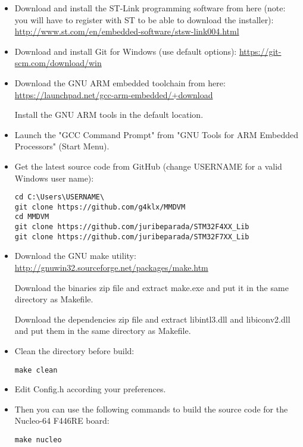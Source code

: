 \documentclass[]{article}
\begin{document}
\begin{itemize}[leftmargin=*]
\item Download and install the ST-Link programming software from here (note: you will have to register with ST to be able to download the installer): \url{http://www.st.com/en/embedded-software/stsw-link004.html}

\item Download and install Git for Windows (use default options):
\url{https://git-scm.com/download/win}

\item Download the GNU ARM embedded toolchain from here:
\url{https://launchpad.net/gcc-arm-embedded/+download}

Install the GNU ARM tools in the default location.

\item Launch the "GCC Command Prompt" from "GNU Tools for ARM Embedded Processors" (Start Menu).

\item Get the latest source code from GitHub (change USERNAME for a valid Windows user name):
\begin{lstlisting}[style=DOS]
cd C:\Users\USERNAME\
git clone https://github.com/g4klx/MMDVM
cd MMDVM
git clone https://github.com/juribeparada/STM32F4XX_Lib
git clone https://github.com/juribeparada/STM32F7XX_Lib
\end{lstlisting}

\item Download the GNU make utility:
\url{http://gnuwin32.sourceforge.net/packages/make.htm}

Download the binaries zip file and extract make.exe and put it in the same directory as Makefile.

Download the dependencies zip file and extract libintl3.dll and libiconv2.dll and put them in the same directory as Makefile.

\item Clean the directory before build:
\begin{lstlisting}[style=DOS]
make clean
\end{lstlisting}

\item Edit Config.h according your preferences.

\item Then you can use the following commands to build the source code for the Nucleo-64 F446RE board:
\begin{lstlisting}[style=DOS]
make nucleo
\end{lstlisting}


\end{itemize}
\end{document}
